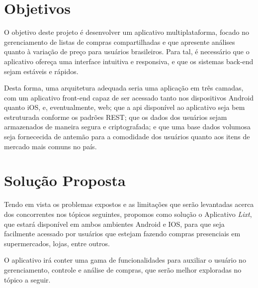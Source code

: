 \label{sec:objetivos}
\section{Objetivos}

O objetivo deste projeto é desenvolver um aplicativo multiplataforma,
focado no gerenciamento de listas de compras compartilhadas e que
apresente análises quanto à variação de preço para usuários
brasileiros. Para tal, é necessário que o aplicativo ofereça uma
interface intuitiva e responsiva, e que os sistemas back-end sejam
estáveis e rápidos.

Desta forma, uma arquitetura adequada seria uma aplicação em três
camadas, com um aplicativo front-end capaz de ser acessado tanto nos
dispositivos Android quanto iOS, e, eventualmente, web; que a api
disponível ao aplicativo seja bem estruturada conforme os padrões
REST; que os dados dos usuários sejam armazenados de maneira segura e
criptografada; e que uma base dados volumosa seja fornececida de
antemão para a comodidade dos usuários quanto aos itens de mercado
mais comuns no país.

\label{sec:solucao}
\section{Solução Proposta}

Tendo em vista os problemas expostos e as limitações que serão
levantadas acerca dos concorrentes nos tópicos seguintes, propomos
como solução o Aplicativo \emph{Lixt}, que estará disponível em ambos
ambientes Android e IOS, para que seja facilmente acessado por
usuários que estejam fazendo compras presenciais em supermercados,
lojas, entre outros.

O aplicativo irá conter uma gama de funcionalidades para auxiliar o
usuário no gerenciamento, controle e análise de compras, que serão
melhor exploradas no tópico a seguir.


